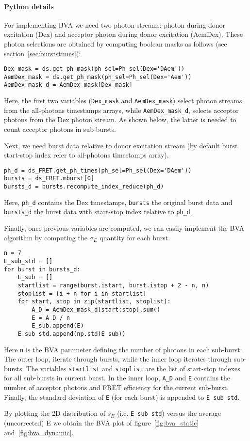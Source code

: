 \paragraph{Python details}
For implementing BVA we need two photon streams: photon during donor excitation (Dex) 
and acceptor photon during donor excitation (AemDex). 
These photon selections are obtained by computing boolean masks as follows 
(see section~\ref{sec:burststimes}):

\begin{lstlisting}
Dex_mask = ds.get_ph_mask(ph_sel=Ph_sel(Dex='DAem'))   
AemDex_mask = ds.get_ph_mask(ph_sel=Ph_sel(Dex='Aem'))
AemDex_mask_d = AemDex_mask[Dex_mask]
\end{lstlisting}

Here, the first two variables (\verb|Dex_mask| and \verb|AemDex_mask|) select 
photon streams from the all-photons timestamps arrays,
while \verb|AemDex_mask_d|, selects acceptor photons from the
Dex photon stream. As shown below, the latter is
needed to count acceptor photons in sub-bursts.

Next, we need burst data relative to donor excitation stream (by default 
burst start-stop index refer to all-photons timestamps array).

\begin{lstlisting}
ph_d = ds_FRET.get_ph_times(ph_sel=Ph_sel(Dex='DAem'))
bursts = ds_FRET.mburst[0] 
bursts_d = bursts.recompute_index_reduce(ph_d)
\end{lstlisting}

Here, \verb|ph_d| contains the Dex timestamps, \verb|bursts| the original burst data and 
\verb|bursts_d| the burst data with start-stop index relative to \verb|ph_d|.

Finally, once previous variables are computed, we can easily implement the BVA algorithm
by computing the $\sigma_E$ quantity for each burst.

\begin{lstlisting}
n = 7
E_sub_std = []
for burst in bursts_d:
    E_sub = []
    startlist = range(burst.istart, burst.istop + 2 - n, n)
    stoplist = [i + n for i in startlist]
    for start, stop in zip(startlist, stoplist): 
        A_D = AemDex_mask_d[start:stop].sum()
        E = A_D / n
        E_sub.append(E)
    E_sub_std.append(np.std(E_sub))
\end{lstlisting}

Here \verb|n| is the BVA parameter defining the number of photons in each sub-burst. The outer loop,
iterate through bursts, while the inner loop iterates through sub-bursts.
The variables \verb|startlist| and \verb|stoplist| are the list of start-stop indexes for
all sub-bursts in current burst.
In the inner loop, \verb|A_D| and \verb|E| contains the number of acceptor photons and 
FRET efficiency for the current sub-burst. Finally, the standard deviation of \verb|E| 
(for each burst) is appended to \verb|E_sub_std|.

By plotting the 2D distribution of $s_E$ (i.e. \verb|E_sub_std|) versus the average (uncorrected) E 
we obtain the BVA plot of figure~\ref{fig:bva_static} and~\ref{fig:bva_dynamic}.


